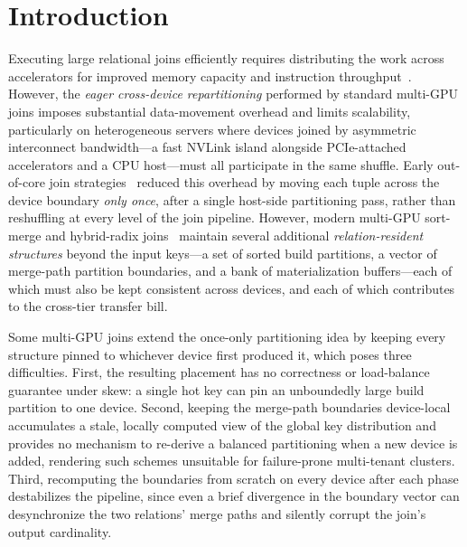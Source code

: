 \documentclass{article}
\begin{document}
\section{Introduction}
\label{sec:introduction}

Executing large relational joins efficiently requires distributing the work
across accelerators for improved memory capacity and instruction
throughput~\citep{paul2021revisiting,sioulas2019hardware}. However, the
\emph{eager cross-device repartitioning} performed by standard multi-GPU joins
imposes substantial data-movement overhead and limits scalability, particularly
on heterogeneous servers where devices joined by asymmetric interconnect
bandwidth---a fast NVLink island alongside PCIe-attached accelerators and a CPU
host---must all participate in the same shuffle. Early out-of-core join
strategies~\citep{kim2009sortvshash,balkesen2013multicore} reduced this overhead
by moving each tuple across the device boundary \emph{only once}, after a single
host-side partitioning pass, rather than reshuffling at every level of the join
pipeline. However, modern multi-GPU sort-merge and hybrid-radix
joins~\citep{maltry2025multigpu,rui2020efficient} maintain several additional
\emph{relation-resident structures} beyond the input keys---a set of sorted
build partitions, a vector of merge-path partition boundaries, and a bank of
materialization buffers---each of which must also be kept consistent across
devices, and each of which contributes to the cross-tier transfer bill.

Some multi-GPU joins extend the once-only partitioning idea by keeping every
structure pinned to whichever device first produced it, which poses three
difficulties. First, the resulting placement has no correctness or
load-balance guarantee under skew: a single hot key can pin an unboundedly large
build partition to one device. Second, keeping the merge-path boundaries
device-local accumulates a stale, locally computed view of the global key
distribution and provides no mechanism to re-derive a balanced partitioning when
a new device is added, rendering such schemes unsuitable for failure-prone
multi-tenant clusters. Third, recomputing the boundaries from scratch on every
device after each phase destabilizes the pipeline, since even a brief divergence
in the boundary vector can desynchronize the two relations' merge paths and
silently corrupt the join's output cardinality.
\end{document}

